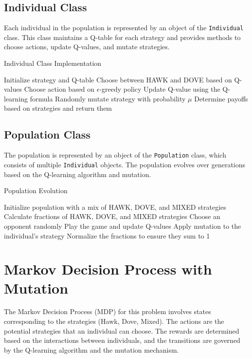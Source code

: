\documentclass{article}
\begin{document}
\subsection{Individual Class}
Each individual in the population is represented by an object of the \texttt{Individual} class. This class maintains a Q-table for each strategy and provides methods to choose actions, update Q-values, and mutate strategies.

\begin{algorithm}[H]
\caption{Individual Class Implementation}
\begin{algorithmic}[1]
\STATE Initialize strategy and Q-table
        \STATE Choose between HAWK and DOVE based on Q-values
    \ELSE
        \STATE Choose action based on $\epsilon$-greedy policy
    \ENDIF
\ENDFUNCTION
{}
    \STATE Update Q-value using the Q-learning formula
\ENDFUNCTION
{}
    \STATE Randomly mutate strategy with probability $\mu$
\ENDFUNCTION
{}
    \STATE Determine payoffs based on strategies and return them
\ENDFUNCTION
\end{algorithmic}
\end{algorithm}

\subsection{Population Class}
The population is represented by an object of the \texttt{Population} class, which consists of multiple \texttt{Individual} objects. The population evolves over generations based on the Q-learning algorithm and mutation.

\begin{algorithm}[H]
\caption{Population Evolution}
\begin{algorithmic}[1]
\STATE Initialize population with a mix of HAWK, DOVE, and MIXED strategies
    \STATE Calculate fractions of HAWK, DOVE, and MIXED strategies
        \STATE Choose an opponent randomly
        \STATE Play the game and update Q-values
        \STATE Apply mutation to the individual's strategy
    \ENDFOR
    \STATE Normalize the fractions to ensure they sum to 1
\ENDFOR
\end{algorithmic}
\end{algorithm}

\section{Markov Decision Process with Mutation}
The Markov Decision Process (MDP) for this problem involves states corresponding to the strategies (Hawk, Dove, Mixed). The actions are the potential strategies that an individual can choose. The rewards are determined based on the interactions between individuals, and the transitions are governed by the Q-learning algorithm and the mutation mechanism.
\end{document}
